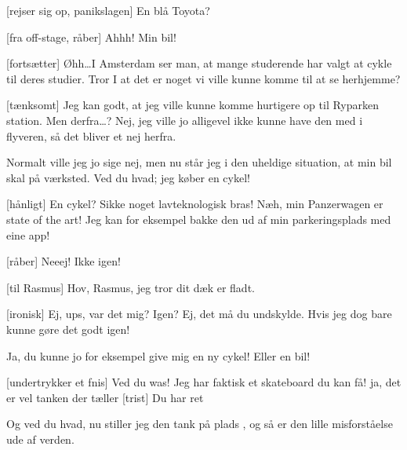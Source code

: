 \documentclass[a4paper,11pt]{article}
\begin{document}
\begin{sketch}
[rejser sig op, panikslagen] En blå Toyota?


[fra off-stage, råber] Ahhh! Min bil!



[fortsætter] Øhh\ldots I Amsterdam ser man, at mange studerende har valgt at cykle til
  deres studier. Tror I at det er noget vi ville kunne komme til at se herhjemme?

[tænksomt] Jeg kan godt, at jeg ville kunne komme hurtigere op til Ryparken
                   station. Men derfra\ldots? Nej, jeg ville jo alligevel ikke kunne have
                   den med i flyveren, så det bliver et nej herfra.

 Normalt ville jeg jo sige nej, men nu står jeg i den uheldige situation, at
         min bil skal på værksted. Ved du hvad; jeg køber en cykel! 

[hånligt] En cykel? Sikke noget lavteknologisk bras! Næh, min Panzerwagen er state of the
                  art! Jeg kan for eksempel bakke den ud af min parkeringsplads med eine app!


[råber] Neeej! Ikke igen!

[til Rasmus] Hov, Rasmus, jeg tror dit dæk er fladt.

[ironisk] Ej, ups, var det mig? Igen? Ej, det må du undskylde.
                  Hvis jeg dog bare kunne gøre det godt igen!

 Ja, du kunne jo for eksempel give mig en ny cykel! 
         Eller en bil! 

[undertrykker et fnis] Ved du was! Jeg har faktisk et skateboard du kan få!
 ja, det er vel tanken der tæller
[trist] Du har ret

 Og ved du hvad, nu stiller jeg den tank på plads , og så er den
   lille misforståelse ude af verden.


\end{sketch}
\end{document}
